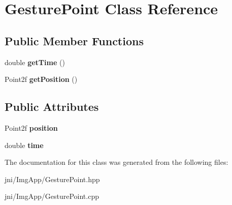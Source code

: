 \hypertarget{classGesturePoint}{\section{\-Gesture\-Point \-Class \-Reference}
\label{classGesturePoint}
}
\subsection*{\-Public \-Member \-Functions}
\begin{DoxyCompactItemize}
\item 
\hypertarget{classGesturePoint_aff89af64ca5ad8ef7e0016d21a8d7355}{double {\bfseries get\-Time} ()}\label{classGesturePoint_aff89af64ca5ad8ef7e0016d21a8d7355}

\item 
\hypertarget{classGesturePoint_a85e2584a461cd0bb75e3e17612c3dbe6}{\-Point2f {\bfseries get\-Position} ()}\label{classGesturePoint_a85e2584a461cd0bb75e3e17612c3dbe6}

\end{DoxyCompactItemize}
\subsection*{\-Public \-Attributes}
\begin{DoxyCompactItemize}
\item 
\hypertarget{classGesturePoint_a1c868ede675da84e759c5b34f842a091}{\-Point2f {\bfseries position}}\label{classGesturePoint_a1c868ede675da84e759c5b34f842a091}

\item 
\hypertarget{classGesturePoint_acc9f7fa1c65945e4dc2a1b41cedd7e9b}{double {\bfseries time}}\label{classGesturePoint_acc9f7fa1c65945e4dc2a1b41cedd7e9b}

\end{DoxyCompactItemize}


\-The documentation for this class was generated from the following files\-:\begin{DoxyCompactItemize}
\item 
jni/\-Img\-App/\-Gesture\-Point.\-hpp\item 
jni/\-Img\-App/\-Gesture\-Point.\-cpp\end{DoxyCompactItemize}
